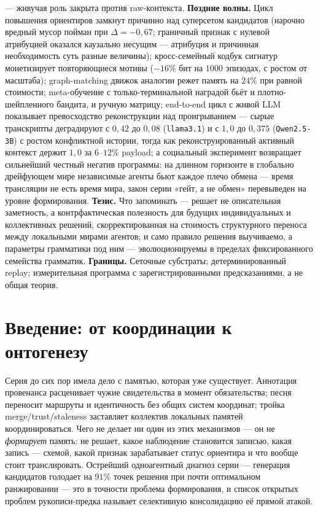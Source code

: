 \documentclass{article}
\begin{document}
--- живучая роль закрыта против raw-контекста.
\textbf{Поздние волны.} Цикл повышения ориентиров замкнут причинно
над суперсетом кандидатов (нарочно вредный мусор пойман при
$\Delta=-0{,}67$; граничный признак с нулевой атрибуцией оказался
каузально несущим --- атрибуция и причинная необходимость суть разные
величины); кросс-семейный кодбук сигнатур монетизирует повторяющиеся
мотивы ($-16\%$ бит на $1000$ эпизодах, с ростом от масштаба);
graph-matching движок аналогии режет память на $24\%$ при равной
стоимости; meta-обучение с только-терминальной наградой бьёт и
плотно-шейпленного бандита, и ручную матрицу; end-to-end цикл с живой
LLM показывает превосходство реконструкции над проигрыванием ---
сырые транскрипты деградируют с $0{,}42$ до $0{,}08$
(\texttt{llama3.1}) и с $1{,}0$ до $0{,}375$ (\texttt{Qwen2.5-3B})
с ростом конфликтной истории, тогда как реконструированный активный
контекст держит $1{,}0$ за $6$--$12\%$ payload; а социальный
эксперимент возвращает сильнейший честный негатив программы: на
длинном горизонте в глобально дрейфующем мире независимые агенты бьют
каждое плечо обмена --- время трансляции не есть время мира, закон
серии «гейт, а не обмен» перевыведен на уровне формирования.
\textbf{Тезис.} Что запоминать --- решает не описательная
заметность, а контрфактическая полезность для будущих индивидуальных
и коллективных решений, скорректированная на стоимость структурного
переноса между локальными мирами агентов; и само правило решения
выучиваемо, а параметры грамматики под ним --- эволюционируемы в
пределах фиксированного семейства грамматик.
\textbf{Границы.} Сеточные субстраты; детерминированный replay;
измерительная программа с зарегистрированными предсказаниями, а не
общая теория.

\FloatBarrier
\section{Введение: от координации к онтогенезу}
\label{p5:sec:intro}

Серия до сих пор имела дело с памятью, которая уже существует.
Аннотация провенанса расценивает чужие свидетельства в момент
обязательства; песня переносит маршруты и идентичность без общих
систем координат; тройка merge/trust/staleness заставляет коллектив
локальных памятей координироваться. Чего не делает ни один из этих
механизмов --- он не \emph{формирует} память: не решает, какое
наблюдение становится записью, какая запись --- схемой, какой признак
зарабатывает статус ориентира и что вообще стоит транслировать.
Острейший одноагентный диагноз серии --- генерация кандидатов
голодает на $91\%$ точек решения при почти оптимальном ранжировании
--- это в точности проблема формирования, и список открытых проблем
рукописи-предка называет селективную консолидацию её прямой атакой.
\end{document}

